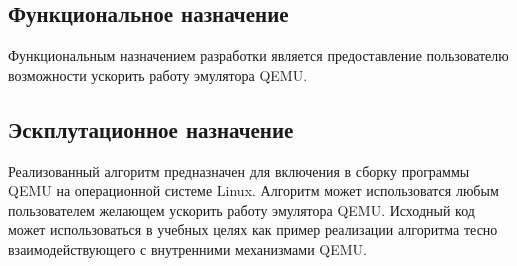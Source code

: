 \subsection{Функциональное назначение}
Функциональным назначением разработки является предоставление пользователю возможности ускорить работу эмулятора QEMU.


\subsection{Эскплутационное назначение}
Реализованный алгоритм предназначен для включения в сборку программы QEMU на операционной системе Linux. Алгоритм может использоватся любым пользователем желающем ускорить работу эмулятора QEMU. Исходный код может использоваться в учебных целях как пример реализации алгоритма тесно взаимодействующего с внутренними механизмами QEMU.